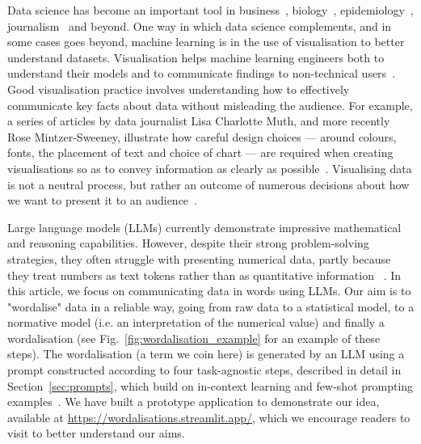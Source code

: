 \documentclass{article}
\begin{document}
Data science has become an important tool in business~\cite{davenport2020beyond}, biology~\cite{greener2022guide}, epidemiology~\cite{latif2020leveraging}, journalism~\cite{cairo2016truthful} and beyond. One way in which data science complements, and in some cases goes beyond, machine learning is in the use of visualisation to better understand datasets. Visualisation helps machine learning engineers both to understand their models and to communicate findings to non-technical users~\cite{zhang2020data}. Good visualisation practice involves understanding how to effectively communicate key facts about data without misleading the audience. For example, a series of articles by data journalist Lisa Charlotte Muth, and more recently Rose Mintzer-Sweeney, illustrate how careful design choices --- around colours, fonts, the placement of text and choice of chart --- are required when creating visualisations so as to convey information as clearly as possible~\cite{mintzer-sweeney_muth_2024}. Visualising data is not a neutral process, but rather an outcome of numerous decisions about how we want to present it to an audience~\cite{kennedy2016work}.  

Large language models (LLMs) currently demonstrate impressive mathematical and reasoning capabilities. However, despite their strong problem-solving strategies, they often struggle with presenting numerical data, partly because they treat numbers as text tokens rather than as quantitative information ~\cite{yang2025number, li2025exposing}.
In this article, we focus on communicating data in words using LLMs. Our aim is to "wordalise" data in a reliable way, going from raw data to a statistical model, to a normative model (i.e. an interpretation of the numerical value) and finally a wordalisation (see Fig.~\ref{fig:wordalisation_example} for an example of these steps). 
The wordalisation (a term we coin here) is generated by an LLM using a prompt constructed according to four task-agnostic steps, described in detail in Section~\ref{sec:prompts}, which build on in-context learning and few-shot prompting examples~\cite{brown2020language}. We have built a prototype application to demonstrate our idea, available at \url{ https://wordalisations.streamlit.app/}, which we encourage readers to visit to better understand our aims.
\end{document}
